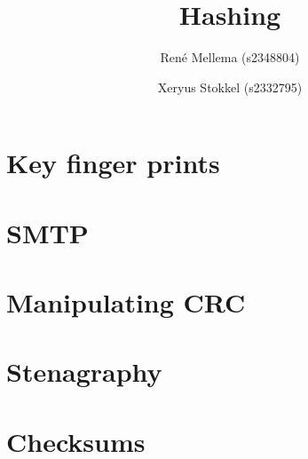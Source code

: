 \documentclass[a4paper, 10pt]{article}
\title{Hashing}
\author{Ren\'e Mellema (s2348804) \and Xeryus Stokkel (s2332795)}
\date{} %
\begin{document}
\maketitle

\setcounter{section}{17}

\section{Key finger prints}


\section{SMTP}


\section{Manipulating CRC}


\section{Stenagraphy}


\section{Checksums}

\end{document}
